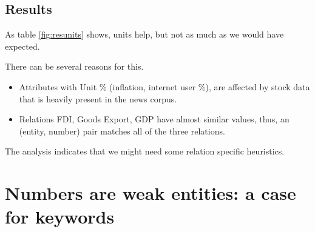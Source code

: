 \documentclass[a4paper,10pt]{article}
\begin{document}
\subsection{Results}
As table \ref{fig:resunits} shows, units help, but not as much as we would have expected.
\begin{center}
\begin{table}[H]
\caption{Unit Based}
\label{fig:resunits}
\end{table}
\end{center}

There can be several reasons for this.
 \begin{itemize}
  \item Attributes with Unit \% (inflation, internet user \%), are affected by stock data that is heavily present in the news corpus.
  \item Relations FDI, Goods Export, GDP have almost similar values, thus, an (entity, number) pair matches all of the three relations. 
  \end{itemize}
  
The analysis indicates that we might need some relation specific heuristics.
 

\section{Numbers are weak entities: a case for keywords}
\end{document}
